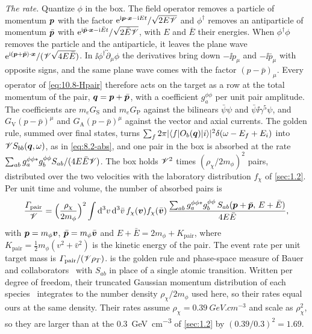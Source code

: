 \emph{The rate.} Quantize $\phi$ in the box. The field operator removes a particle of momentum $\bm{p}$ with the factor $\mathrm{e}^{\mathrm{i}\bm{p}\cdot\bm{x} - \mathrm{i} E t}/\sqrt{2E\mathscr{V}}$ and $\phi^\dagger$ removes an antiparticle of momentum $\bar{\bm{p}}$ with $\mathrm{e}^{\mathrm{i}\bar{\bm{p}}\cdot\bm{x} - \mathrm{i}\bar Et}/\sqrt{2\bar E\mathscr{V}}$, with $E$ and $\bar E$ their energies. When $\phi^\dagger\phi$ removes the particle and the antiparticle, it leaves the plane wave $\mathrm{e}^{\mathrm{i}(\bm{p} + \bar{\bm{p}})\cdot\bm{x}}/(\mathscr{V}\sqrt{4E\bar E})$. In $\ii\phi^\dagger\overleftrightarrow{\partial}_{\!\mu}\phi$ the derivatives bring down $-\ii p_\mu$ and $-\ii\bar p_\mu$ with opposite signs, and the same plane wave comes with the factor $(p - \bar p)_\mu$. Every operator of \cref{eq:10.8-Hpair} therefore acts on the target as a row at the total momentum of the pair, $\bm{q} = \bm{p} + \bar{\bm{p}}$, with a coefficient $g^{\phi\phi}_a$ per unit pair amplitude. The coefficients are $m_eG_{\mathrm{S}}$ and $m_eG_{\mathrm{P}}$ against the bilinears $\bar\psi\psi$ and $\bar\psi\ii\gamma^5\psi$, and $G_{\mathrm{V}}(p - \bar p)^\mu$ and $G_{\mathrm{A}}(p - \bar p)^\mu$ against the vector and axial currents. The golden rule, summed over final states, turns $\sum_f2\pi|\langle f|O_b(\bm{q})|i\rangle|^2\delta(\omega - E_f + E_i)$ into $\mathscr{V} S_{bb}(\bm{q}, \omega)$, as in \cref{eq:8.2-abs}, and one pair in the box is absorbed at the rate $\sum_{ab}g^{\phi\phi*}_a g^{\phi\phi}_bS_{ab}/(4E\bar E\mathscr{V})$. The box holds $\mathscr{V}^2$ times $(\rho_\chi/2m_\phi)^2$ pairs, distributed over the two velocities with the laboratory distribution $f_\chi$ of \cref{sec:1.2}. Per unit time and volume, the number of absorbed pairs is
\begin{equation}
  \frac{\varGamma_{\mathrm{pair}}}{\mathscr{V}} = \Bigl(\frac{\rho_\chi}{2m_\phi}\Bigr)^2\int\mathrm{d}^3v\,\mathrm{d}^3\bar v\,f_\chi(\bm{v})f_\chi(\bar{\bm{v}})\,
  \frac{\sum_{ab}g^{\phi\phi*}_a g^{\phi\phi}_b\,S_{ab}(\bm{p} + \bar{\bm{p}},\,E + \bar E)}{4E\bar E} ,
  \label{eq:10.8-pair}
\end{equation}
with $\bm{p} = m_\phi\bm{v}$, $\bar{\bm{p}} = m_\phi\bar{\bm{v}}$ and $E + \bar E = 2m_\phi + K_{\mathrm{pair}}$, where $K_{\mathrm{pair}} = \frac12m_\phi(v^2 + \bar v^2)$ is the kinetic energy of the pair. The event rate per unit target mass is $\varGamma_{\mathrm{pair}}/(\mathscr{V}\rho_T)$.  is the golden rule and phase-space measure of Bauer and collaborators~\cite[Eqs.~(5) and (7)]{bauer2026dark} with $S_{ab}$ in place of a single atomic transition. Written per degree of freedom, their truncated Gaussian momentum distribution of each species~\cite[Eq.~(8)]{bauer2026dark} integrates to the number density $\rho_\chi/2m_\phi$ used here, so their rates equal ours at the same density. Their rates assume $\rho_\chi = \SI{0.39}{GeV.cm^{-3}}$ and scale as $\rho_\chi^2$, so they are larger than at the \SI{0.3}{GeV.cm^{-3}} of \cref{sec:1.2} by $(0.39/0.3)^2 = 1.69$.

